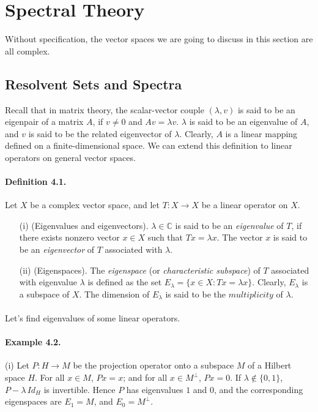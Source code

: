 \documentclass{article}
\begin{document}
\newpage
\section{Spectral Theory}
Without specification, the vector spaces we are going to discuss in this section are all complex.
\subsection{Resolvent Sets and Spectra}
Recall that in matrix theory, the scalar-vector couple $(\lambda,v)$ is said to be an eigenpair of a matrix $A$, if $v\neq 0$ and $Av = \lambda v$. $\lambda$ is said to be an eigenvalue of $A$, and $v$ is said to be the related eigenvector of $\lambda$. Clearly, $A$ is a linear mapping defined on a finite-dimensional space. We can extend this definition to linear operators on general vector spaces.

\paragraph{Definition 4.1.\label{def:4.1}} Let $X$ be a complex vector space, and let $T:X\to X$ be a linear operator on $X$.
\begin{itemize}
	\item[(i)] (Eigenvalues and eigenvectors). $\lambda\in\mathbb{C}$ is said to be an \textit{eigenvalue} of $T$, if there exists nonzero vector $x\in X$ such that $Tx=\lambda x$. The vector $x$ is said to be an \textit{eigenvector} of $T$ associated with $\lambda$.
	\item[(ii)] (Eigenspaces). The \textit{eigenspace} (or \textit{characteristic subspace}) of $T$ associated with eigenvalue $\lambda$ is defined as the set $E_\lambda=\{x\in X: Tx=\lambda x\}$. Clearly, $E_\lambda$ is a subspace of $X$. The dimension of $E_\lambda$ is said to be the $\textit{multiplicity}$ of $\lambda$.
\end{itemize}

\paragraph{} Let's find eigenvalues of some linear operators.

\paragraph{Example 4.2.\label{example:4.2}} (i) Let $P:H\to M$ be the projection operator onto a subspace $M$ of a Hilbert space $H$. For all $x\in M$, $Px=x$; and for all $x\in M^\perp$, $Px=0$. If $\lambda\notin\{0,1\}$, $P-\lambda\,Id_H$ is invertible. Hence $P$ has eigenvalues $1$ and $0$, and the corresponding eigenspaces are $E_1=M$, and $E_0=M^\perp$. \vspace{0.1cm}
\end{document}
